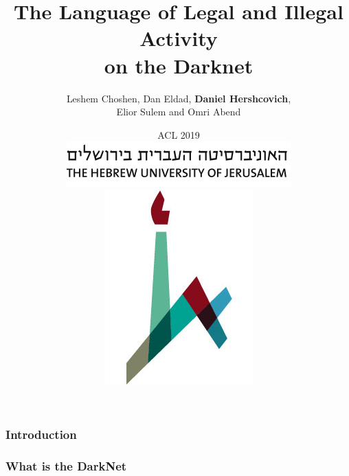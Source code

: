 \documentclass[t,xcolor={svgnames,table}]{beamer}
\begin{document}
\title[]{The Language of Legal and Illegal Activity \\ on the Darknet}
\author[Daniel Hershcovich]{Leshem Choshen, Dan Eldad, \textbf{Daniel Hershcovich}, \\
Elior Sulem and Omri Abend }
\date[]{ACL 2019 \\
	\hspace{0.5cm}
\includegraphics[width=.5\textwidth]{huji_banner.png}
\includegraphics[width=.1\textwidth]{huji_logo.jpg}}

\begin{frame}
\titlepage
\end{frame}

\begin{frame}
\frametitle{Introduction}
\end{frame}

{%
\begin{frame}
	\frametitle{What is the DarkNet}
\end{frame}
}
\end{document}
